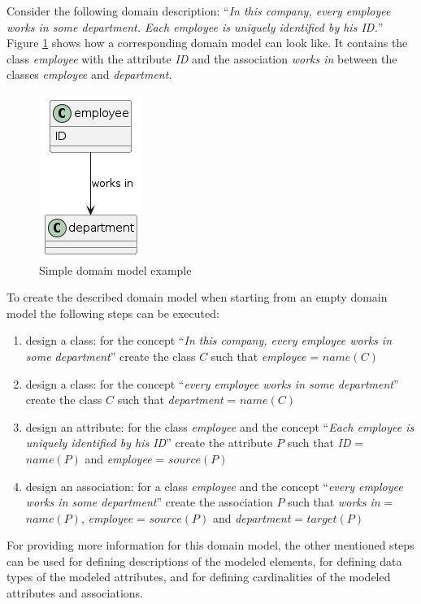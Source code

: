 Consider the following domain description: ``\textit{In this company, every employee works in some department. Each employee is uniquely identified by his ID.}'' Figure \ref{fig:simple-employee-domain-model} shows how a corresponding domain model can look like. It contains the class \textit{employee} with the attribute \textit{ID} and the association \textit{works in} between the classes \textit{employee} and \textit{department}.

\begin{figure}[!h]
    \centering
    \includegraphics[scale=0.65]{img/domain-modeling-steps-example.png}
    \caption{\centering Simple domain model example}
    \label{fig:simple-employee-domain-model}
\end{figure}

To create the described domain model when starting from an empty domain model the following steps can be executed:

\begin{enumerate}
\item design a class: for the concept ``\textit{In this company, every employee works in some department}'' create the class $C$ such that \textit{employee} = $name(C)$
\item design a class: for the concept ``\textit{every employee works in some department}'' create the class $C$ such that \textit{department} = $name(C)$
\item design an attribute: for the class \textit{employee} and the concept ``\textit{Each employee is uniquely identified by his ID}'' create the attribute $P$ such that \textit{ID} = $name(P)$ and \textit{employee} = $source(P)$
\item design an association: for a class \textit{employee} and the concept ``\textit{every employee works in some department}'' create the association $P$ such that \textit{works in} = $name(P)$, \textit{employee} = $source(P)$ and \textit{department} = $target(P)$
\end{enumerate}

For providing more information for this domain model, the other mentioned steps can be used for defining descriptions of the modeled elements, for defining data types of the modeled attributes, and for defining cardinalities of the modeled attributes and associations.